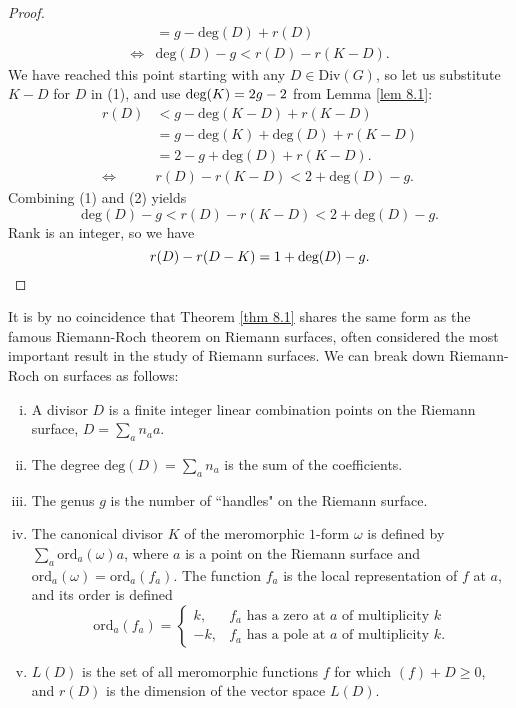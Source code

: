 \documentclass[openany, amssymb, psamsfonts]{amsart}
\theoremstyle{definition}
\numberwithin{equation}{section}
\begin{document}
\begin{proof}
\begin{align*}
    &=g-\text{deg}(D)+r(D)\\
    \iff & \text{deg}(D)-g<r(D)-r(K-D) \tag{1}.
\end{align*}
We have reached this point starting with any $D\in \text{Div}(G)$, so let us substitute $K-D$ for $D$ in (1), and use $\textup{deg}(K)=2g-2$ from Lemma \ref{lem 8.1}:
\begin{align*}
    r(D)&<g-\text{deg}(K-D)+r(K-D)\\
    &=g-\text{deg}(K)+\text{deg}(D)+r(K-D)\\
    &=2-g+\text{deg}(D)+r(K-D).\\
    \iff & r(D)-r(K-D)<2+\text{deg}(D)-g \tag{2}.
\end{align*}
Combining (1) and (2) yields
\[\text{deg}(D)-g<r(D)-r(K-D)<2+\text{deg}(D)-g.\]
Rank is an integer, so we have 
\[r(D)-r(D-K)=1+\textup{deg}(D)-g.\]
\end{proof}

It is by no coincidence that Theorem \ref{thm 8.1} shares the same form as the famous Riemann-Roch theorem on Riemann surfaces, often considered the most important result in the study of Riemann surfaces. We can break down Riemann-Roch on surfaces as follows:

\begin{enumerate}[(i)]
    \item A divisor $D$ is a finite integer linear combination points on the Riemann surface, $D=\sum_a n_aa$.
    \item The degree $\text{deg}(D)=\sum_a n_a$ is the sum of the coefficients.
    \item The genus $g$ is the number of ``handles" on the Riemann surface.
    \item The canonical divisor $K$ of the meromorphic $1$-form $\omega$ is defined by $\sum_a \text{ord}_a(\omega)a$,
    where $a$ is a point on the Riemann surface and $\text{ord}_a(\omega)=\text{ord}_a(f_a)$. The function $f_a$ is the local representation of $f$ at $a$, and its order is defined
    \[\text{ord}_a(f_a)=
    \begin{cases}
        k, &f_a \text{ has a zero at }a \text{ of multiplicity }k\\
        -k, &f_a \text{ has a pole at }a \text{ of multiplicity }k.
    \end{cases}
    \]
    \item $L(D)$ is the set of all meromorphic functions $f$ for which $(f)+D\geq 0$, and $r(D)$ is the dimension of the vector space $L(D)$. 
\end{enumerate}
\end{document}
